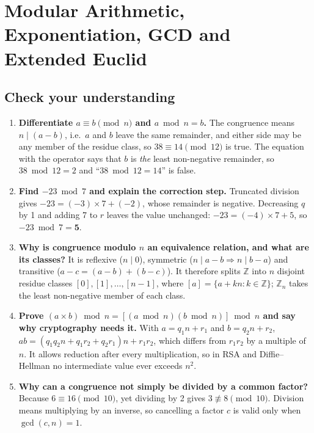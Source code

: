 \section{Modular Arithmetic, Exponentiation, GCD and Extended Euclid}\label{q:07_modular}

\subsection*{Check your understanding}
\begin{enumerate}[leftmargin=1.6em,itemsep=3pt]
  \item \textbf{Differentiate $a \equiv b \pmod n$ and $a \bmod n = b$.} The congruence means $n \mid (a - b)$, i.e.\ $a$ and $b$ leave the same remainder, and either side may be any member of the residue class, so $38 \equiv 14 \pmod{12}$ is true. The equation with the operator says that $b$ is \emph{the} least non-negative remainder, so $38 \bmod 12 = 2$ and ``$38 \bmod 12 = 14$'' is false.
  \item \textbf{Find $-23 \bmod 7$ and explain the correction step.} Truncated division gives $-23 = (-3) \times 7 + (-2)$, whose remainder is negative. Decreasing $q$ by 1 and adding 7 to $r$ leaves the value unchanged: $-23 = (-4) \times 7 + 5$, so $-23 \bmod 7 = \mathbf{5}$.
  \item \textbf{Why is congruence modulo $n$ an equivalence relation, and what are its classes?} It is reflexive ($n \mid 0$), symmetric ($n \mid a - b \Rightarrow n \mid b - a$) and transitive ($a - c = (a - b) + (b - c)$). It therefore splits $\mathbb{Z}$ into $n$ disjoint residue classes $[0], [1], \dots, [n-1]$, where $[a] = \{a + kn : k \in \mathbb{Z}\}$; $\mathbb{Z}_n$ takes the least non-negative member of each class.
  \item \textbf{Prove $(a \times b) \bmod n = [(a \bmod n)(b \bmod n)] \bmod n$ and say why cryptography needs it.} With $a = q_1 n + r_1$ and $b = q_2 n + r_2$, $ab = (q_1 q_2 n + q_1 r_2 + q_2 r_1)n + r_1 r_2$, which differs from $r_1 r_2$ by a multiple of $n$. It allows reduction after every multiplication, so in RSA and Diffie--Hellman no intermediate value ever exceeds $n^2$.
  \item \textbf{Why can a congruence not simply be divided by a common factor?} Because $6 \equiv 16 \pmod{10}$, yet dividing by 2 gives $3 \not\equiv 8 \pmod{10}$. Division means multiplying by an inverse, so cancelling a factor $c$ is valid only when $\gcd(c, n) = 1$.

\end{enumerate}
